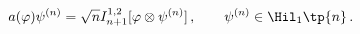 \begin{equation*}
    a(\varphi)\psi^{(n)} = \sqrt{n}I_{n+1}^{1,2}[\varphi\otimes \psi^{(n)}]\,,\qquad\psi^{(n)}\in\Hil_1\tp{n}\,.
  \end{equation*}


